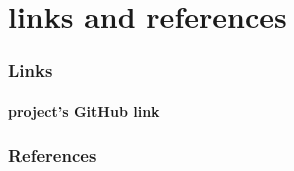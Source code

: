 \documentclass[12pt,a4paper]{article}
\begin{document}
	\part{links and references}\label{linkAndRef}
	
	\section{Links}\label{linkAndRef.links}
	\subsection*{project's GitHub link}
	\href{https://github.com/Matin0789/FinalFight.git}{\color{blue}{https://github.com/Matin0789/FinalFight.git}}
	
	\section{References}\label{linkAndRef.ref}
	 \href{https://www.geeksforgeeks.org/c-plus-plus/}{\color{blue}{https://www.geeksforgeeks.org/c-plus-plus/}}\\
	 \href{https://www.programiz.com/cpp-programming}{\color{blue}{https://www.programiz.com/cpp-programming}}
\end{document}
